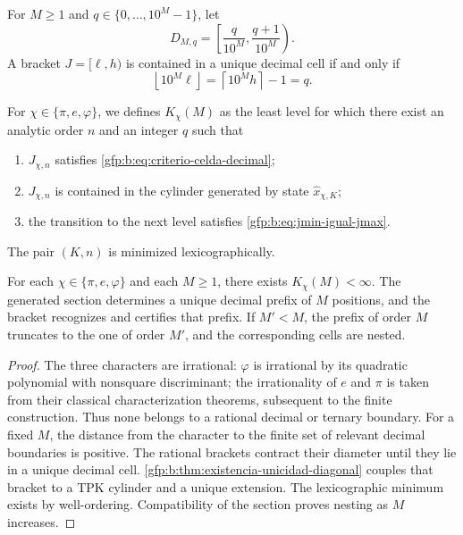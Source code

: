 For \(M\geq1\) and \(q\in\{0,\ldots,10^M-1\}\), let
\[
 D_{M,q}=
 \left[
 \frac{q}{10^M},
 \frac{q+1}{10^M}
 \right).
\]
A bracket \(J=[\ell,h)\) is contained in a unique decimal cell if
and only if
\begin{equation}
 \boxed{
 \left\lfloor10^M\ell\right\rfloor
 =\left\lceil10^Mh\right\rceil-1=q.}
 \label{gfp:b:eq:criterio-celda-decimal}
\end{equation}

\begin{definition}
For \(\chi\in\{\pi,e,\varphi\}\), we defines \(K_\chi(M)\) as the least
level for which there exist an analytic order \(n\) and an integer \(q\) such
that
\begin{enumerate}
 \item \(J_{\chi,n}\) satisfies
       \eqref{gfp:b:eq:criterio-celda-decimal};
 \item \(J_{\chi,n}\) is contained in the cylinder generated by
       state \(\widehat x_{\chi,K}\);
 \item the transition to the next level satisfies
       \eqref{gfp:b:eq:jmin-igual-jmax}.
\end{enumerate}
The pair \((K,n)\) is minimized lexicographically.
\end{definition}

\begin{theorem}
\label{gfp:b:thm:precision-decimal-arbitraria}
For each \(\chi\in\{\pi,e,\varphi\}\) and each \(M\geq1\), there exists
\(K_\chi(M)<\infty\). The generated section determines a unique decimal prefix
of \(M\) positions, and the bracket recognizes and certifies that prefix. If
\(M'<M\), the prefix of order \(M\) truncates to the one of
order \(M'\), and the corresponding cells are nested.
\end{theorem}

\begin{proof}
The three characters are irrational: \(\varphi\) is irrational by its quadratic
polynomial with nonsquare discriminant; the irrationality of \(e\) and
\(\pi\) is taken from their classical characterization theorems, subsequent to
the finite construction. Thus none belongs to a rational decimal or
ternary boundary. For a fixed \(M\), the distance from the character to the finite
set of relevant decimal boundaries is positive. The rational
brackets contract their diameter until they lie in a unique decimal cell.
\cref{gfp:b:thm:existencia-unicidad-diagonal} couples that bracket to a
TPK cylinder and a unique extension. The lexicographic minimum exists by
well-ordering. Compatibility of the section proves nesting as
\(M\) increases.
\end{proof}


